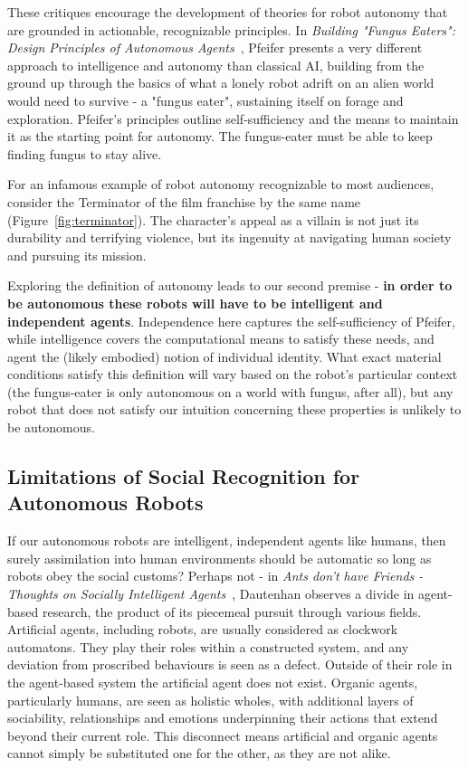 \documentclass{sfuthesis}
\begin{document}
These critiques encourage the development of theories for robot autonomy that are grounded in actionable, recognizable principles. In \textit{Building "Fungus Eaters": Design Principles of Autonomous Agents}~\cite{pfeifer1996building}, Pfeifer presents a very different approach to intelligence and autonomy than classical AI, building from the ground up through the basics of what a lonely robot adrift on an alien world would need to survive - a "fungus eater", sustaining itself on forage and exploration. Pfeifer's principles outline self-sufficiency and the means to maintain it as the starting point for autonomy. The fungus-eater must be able to keep finding fungus to stay alive.



For an infamous example of robot autonomy recognizable to most audiences, consider the Terminator of the film franchise by the same name (Figure~\ref{fig:terminator}). The character's appeal as a villain is not just its durability and terrifying violence, but its ingenuity at navigating human society and pursuing its mission.

Exploring the definition of autonomy leads to our second premise - \textbf{in order to be autonomous these robots will have to be intelligent and independent agents}. Independence here captures the self-sufficiency of Pfeifer, while intelligence covers the computational means to satisfy these needs, and agent the (likely embodied) notion of individual identity. What exact material conditions satisfy this definition will vary based on the robot's particular context (the fungus-eater is only autonomous on a world with fungus, after all), but any robot that does not satisfy our intuition concerning these properties is unlikely to be autonomous.

\subsection{Limitations of Social Recognition for Autonomous Robots}

If our autonomous robots are intelligent, independent agents like humans, then surely assimilation into human environments should be automatic so long as robots obey the social customs? Perhaps not - in \textit{Ants don't have Friends - Thoughts on Socially Intelligent Agents}~\cite{dautenhahn1997ants}, Dautenhan observes a divide in agent-based research, the product of its piecemeal pursuit through various fields. Artificial agents, including robots, are usually considered as clockwork automatons. They play their roles within a constructed system, and any deviation from proscribed behaviours is seen as a defect. Outside of their role in the agent-based system the artificial agent does not exist. Organic agents, particularly humans, are seen as holistic wholes, with additional layers of sociability, relationships and emotions underpinning their actions that extend beyond their current role. This disconnect means artificial and organic agents cannot simply be substituted one for the other, as they are not alike.
\end{document}
